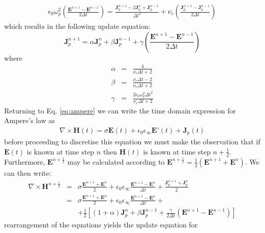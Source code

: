 \documentclass[a4paper, 12pt]{article}
\begin{document}
	\begin{eqnarray}
		\epsilon_0\omega_p^2\left(\frac{\boldsymbol{E}^{n+1}-\boldsymbol{E}^{n-1}}{2\Delta
			t}\right)=\frac{\boldsymbol{J}_p^{n+1}-2\boldsymbol{J}_p^{n}+\boldsymbol{J}_p^{n-1}}{\Delta t^2}+\nu_c\left(\frac{\boldsymbol{J}_p^{n+1}-\boldsymbol{J}_p^{n-1}}{2\Delta
			t}\right)
	\end{eqnarray}
	which results in the following update equation:
	\begin{equation}
		\boldsymbol{J}_p^{n+1}=\alpha\boldsymbol{J}_p^{n}+\beta\boldsymbol{J}_p^{n-1}+\gamma\left(\frac{\boldsymbol{E}^{n+1}-\boldsymbol{E}^{n-1}}{2\Delta
			t}\right)\label{eq:jpmaster}
	\end{equation}
	where 
	\begin{eqnarray}
		\alpha&=&\frac{4}{\nu_c\Delta t+2}\\
		\beta&=&\frac{\nu_c\Delta t-2}{\nu_c\Delta t+2}\\
		\gamma&=&\frac{2\epsilon_0\omega_p^2\Delta t^2}{\nu_c\Delta t+2}
	\end{eqnarray}
	Returning to Eq. \ref{eq:ampere} we can write the time domain
	expression for Ampere's law as
	\begin{eqnarray}
		\nabla\times\boldsymbol{H}(t)=\sigma\boldsymbol{E}(t)+\epsilon_0\epsilon_\infty\boldsymbol{E}'(t)+\boldsymbol{J}_p(t)
	\end{eqnarray}
	before proceeding to discretise this equation we must make the
	observation that if $\boldsymbol{E}(t)$ is known at time step $n$ then
	$\boldsymbol{H}(t)$ is known at time step
	$n+\frac{1}{2}$. Furthermore, $\boldsymbol{E}^{n+\frac{1}{2}}$ may be
	calculated according to
	$\boldsymbol{E}^{n+\frac{1}{2}}=\frac{1}{2}(\boldsymbol{E}^{n+1}+\boldsymbol{E}^{n})$.
	We can then write:
	\begin{eqnarray}
		\nabla\times\boldsymbol{H}^{n+\frac{1}{2}}&=&\sigma\frac{\boldsymbol{E}^{n+1}+\boldsymbol{E}^{n}}{2}+\epsilon_0\epsilon_\infty\frac{\boldsymbol{E}^{n+1}-\boldsymbol{E}^{n}}{\Delta
			t}+\frac{\boldsymbol{J}_p^{n+1}+\boldsymbol{J}_p^{n}}{2}\\
		&=&\sigma\frac{\boldsymbol{E}^{n+1}+\boldsymbol{E}^{n}}{2}+\epsilon_0\epsilon_\infty\frac{\boldsymbol{E}^{n+1}-\boldsymbol{E}^{n}}{\Delta
			t}+\nonumber\\&&+\frac{1}{2}\left[(1+\alpha)\boldsymbol{J}_p^{n}+\beta\boldsymbol{J}_p^{n-1}+\frac{\gamma}{2\Delta
			t}\left(\boldsymbol{E}^{n+1}-\boldsymbol{E}^{n-1}\right)\right]
	\end{eqnarray}
	rearrangement of the equations yields the update equation for
\end{document}
